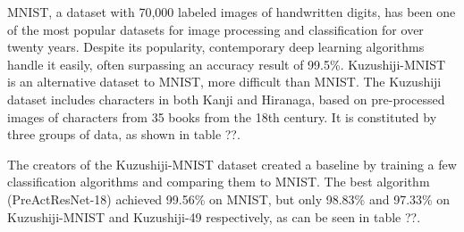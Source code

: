 MNIST, a dataset with 70,000 labeled images of handwritten digits, has been one of the most popular datasets for image processing and classification for over twenty years. Despite its popularity, contemporary deep learning algorithms handle it easily, often surpassing an accuracy result of 99.5\%. Kuzushiji-MNIST is an alternative dataset to MNIST, more difficult than MNIST. The Kuzushiji dataset includes characters in both Kanji and Hiranaga, based on pre-processed images of characters from 35 books from the 18th century. It is constituted by three groups of data, as shown in table ??.

The creators of the Kuzushiji-MNIST dataset created a baseline by training a few classification algorithms and comparing them to MNIST. The best algorithm (PreActResNet-18) achieved 99.56\% on MNIST, but only 98.83\% and 97.33\% on Kuzushiji-MNIST and Kuzushiji-49 respectively, as can be seen in table ??.
